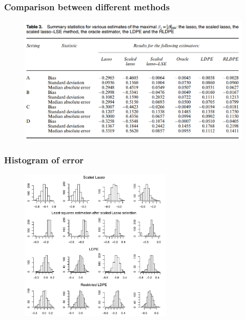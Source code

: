 \begin{frame}
\frametitle{Comparison between different methods}
\begin{figure}[h]
  \centering
  \includegraphics[width=1.0\textwidth]{figs/Table3.png}
  \label{Table1}
\end{figure}
\end{frame}


\begin{frame}
\frametitle{Histogram of error}

\begin{centering}
\begin{figure}[t]
\includegraphics[width = 0.65\textwidth]{1110/hist_diff.pdf}
\label{fig:hist}
\end{figure}
\end{centering}

\end{frame}


